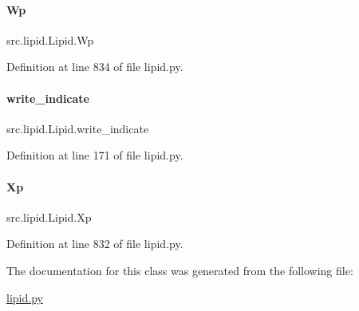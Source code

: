 \mbox{\label{classsrc_1_1lipid_1_1Lipid_af7eb177f313db998be837975c373bdf8}} 
\paragraph{\texorpdfstring{Wp}{Wp}}
{\footnotesize\ttfamily src.\+lipid.\+Lipid.\+Wp}



Definition at line 834 of file lipid.\+py.

\mbox{\label{classsrc_1_1lipid_1_1Lipid_acbb3ad5561e4ae774e191e4970607272}} 
\paragraph{\texorpdfstring{write\+\_\+indicate}{write\_indicate}}
{\footnotesize\ttfamily src.\+lipid.\+Lipid.\+write\+\_\+indicate}



Definition at line 171 of file lipid.\+py.

\mbox{\label{classsrc_1_1lipid_1_1Lipid_a02523ee95002c8fb8174399dd0ae67e5}} 
\paragraph{\texorpdfstring{Xp}{Xp}}
{\footnotesize\ttfamily src.\+lipid.\+Lipid.\+Xp}



Definition at line 832 of file lipid.\+py.



The documentation for this class was generated from the following file\+:\begin{DoxyCompactItemize}
\item 
\hyperlink{lipid_8py}{lipid.\+py}\end{DoxyCompactItemize}

